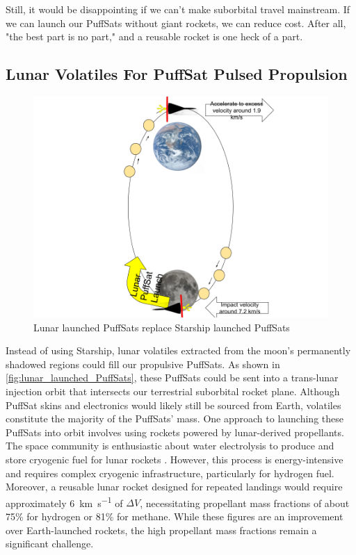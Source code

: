 \documentclass{article}
\begin{document}
{Still, it would be disappointing if we can't make suborbital travel mainstream.   If we can launch our PuffSats without giant rockets, we can reduce cost.   After all, "the best part is no part," \cite{best_part_no_part} and a reusable rocket is one heck of a part.

\subsection{Lunar Volatiles For PuffSat Pulsed Propulsion}

\begin{figure}[htbp]
    \centering
    \includegraphics[width=0.5\linewidth]{images/Water Drawing From Moon.png}
    \caption{Lunar launched PuffSats replace Starship launched PuffSats \cite{earth_image} \cite{moon_image}}
    \label{fig:lunar_launched_PuffSats}
\end{figure}
Instead of using Starship, lunar volatiles extracted from the moon's permanently shadowed regions could fill our propulsive PuffSats. As shown in \autoref{fig:lunar_launched_PuffSats}, these PuffSats could be sent into a trans-lunar injection orbit that intersects our terrestrial suborbital rocket plane. Although PuffSat skins and electronics would likely still be sourced from Earth, volatiles constitute the majority of the PuffSats' mass. One approach to launching these PuffSats into orbit involves using rockets powered by lunar-derived propellants. The space community is enthusiastic about water electrolysis to produce and store cryogenic fuel for lunar rockets \cite{nasa_water}. However, this process is energy-intensive and requires complex cryogenic infrastructure, particularly for hydrogen fuel. Moreover, a reusable lunar rocket designed for repeated landings would require approximately \SI{6}{\km\per\second} of $\Delta V$, necessitating propellant mass fractions of about 75\% for hydrogen or 81\% for methane. While these figures are an improvement over Earth-launched rockets, the high propellant mass fractions remain a significant challenge.   

}
\end{document}
